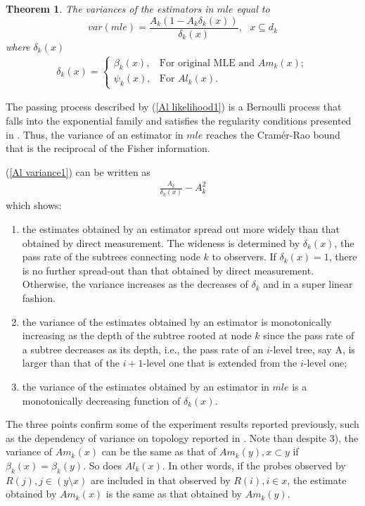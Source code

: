 \documentclass[10pt,onecolumn]{IEEEtran}
\newtheorem{theorem}{\bf Theorem}
\begin{document}
\begin{theorem} \label{Al variance}
The variances of the estimators in $mle$ equal to
\begin{equation}
var(mle)=\dfrac{A_k (1-A_k\delta_k(x) )}{\delta_k(x)}, \mbox{  } x \subseteq d_k
\label{Al variance1}
\end{equation}
where $\delta_k(x)$
\begin{eqnarray}
\delta_k(x)=\begin{cases} \beta_k(x), & \mbox{For original MLE and }  Am_k(x); \\  \psi_k(x), & \mbox{For } Al_k(x). \end{cases} \nonumber
\end{eqnarray}
\end{theorem}
\begin{IEEEproof}
The passing process described by (\ref{Al likelihood1}) is a Bernoulli process that falls into the exponential family and satisfies the regularity conditions presented in \cite{Joshi76}. Thus, the variance of  an estimator in $mle$ reaches the Cram\'{e}r-Rao bound that is the reciprocal of the Fisher information.
\end{IEEEproof}
(\ref{Al variance1}) can be written as
\begin{eqnarray}
\frac{A_k}{\delta_k(x)}-A_k^2
\end{eqnarray}
which shows:
\begin{enumerate}
 \item the estimates obtained by an estimator spread out more widely than that obtained by direct measurement. The wideness is determined by $\delta_k(x)$, the pass rate of the subtrees connecting node $k$ to observers. If $\delta_k(x)=1$, there is no further spread-out than that obtained by direct measurement. Otherwise, the variance increases as the decreases of $\delta_k$ and in a super linear fashion.
\item
the variance of the estimates obtained by an estimator is monotonically increasing as the depth of the subtree rooted at node $k$ since the pass rate of a subtree decreases as its depth, i.e., the pass rate of an $i$-level tree, say A, is larger than that of the $i+1$-level one that is extended from the $i$-level one;
\item the variance of the estimates  obtained by an estimator in $mle$ is a monotonically decreasing function of $\delta_k(x)$. 
\end{enumerate}
The three points confirm some of the experiment results reported previously, such as the dependency of variance on topology reported in \cite{CDHT99}. Note than despite 3), the variance of $Am_k(x)$ can be the same as that of $Am_k(y), x \subset y$ if $\beta_k(x)=\beta_k(y)$. So does $Al_k(x)$. In other words, if the probes observed by $R(j), j \in (y\setminus x)$ are included in that observed by $R(i), i \in x$, the estimate obtained by $Am_k(x)$ is the same as that obtained by $Am_k(y)$.
\end{document}
